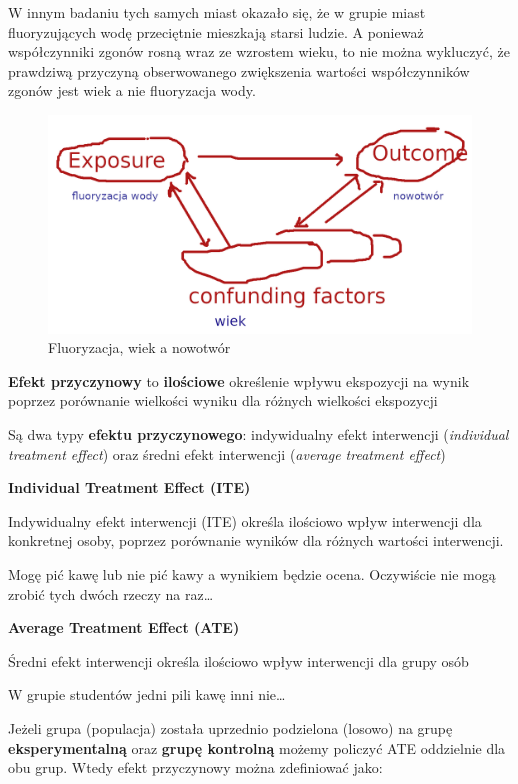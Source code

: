 \documentclass[
  openany]{book}
\begin{document}
W innym badaniu tych samych miast okazało się, że
w grupie miast fluoryzujących wodę przeciętnie mieszkają starsi ludzie.
A ponieważ współczynniki zgonów rosną wraz ze wzrostem wieku, to nie można
wykluczyć, że prawdziwą przyczyną obserwowanego zwiększenia wartości
współczynników zgonów jest wiek a nie fluoryzacja wody.

\begin{figure}
\includegraphics[width=17.25in]{./Model1_cropped} \caption{Fluoryzacja, wiek a nowotwór}\label{fig:fluor}
\end{figure}

\textbf{Efekt przyczynowy} to \textbf{ilościowe} określenie wpływu
ekspozycji na wynik
poprzez porównanie wielkości wyniku dla różnych wielkości ekspozycji

Są dwa typy \textbf{efektu przyczynowego}:
indywidualny efekt interwencji (\emph{individual treatment effect}) oraz
średni efekt interwencji (\emph{average treatment effect})

\textbf{Individual Treatment Effect (ITE)}

Indywidualny efekt interwencji (ITE) określa ilościowo wpływ
interwencji dla konkretnej osoby, poprzez porównanie
wyników dla różnych wartości interwencji.

Mogę pić kawę lub nie pić kawy a wynikiem będzie ocena. Oczywiście
nie mogą zrobić tych dwóch rzeczy na raz\ldots{}

\textbf{Average Treatment Effect (ATE)}

Średni efekt interwencji
określa ilościowo wpływ interwencji dla grupy osób

W grupie studentów jedni pili kawę inni nie\ldots{}

Jeżeli grupa (populacja) została uprzednio podzielona (losowo) na
grupę \textbf{eksperymentalną} oraz \textbf{grupę kontrolną}
możemy policzyć ATE oddzielnie dla obu grup.
Wtedy efekt przyczynowy można zdefiniować jako:
\end{document}
